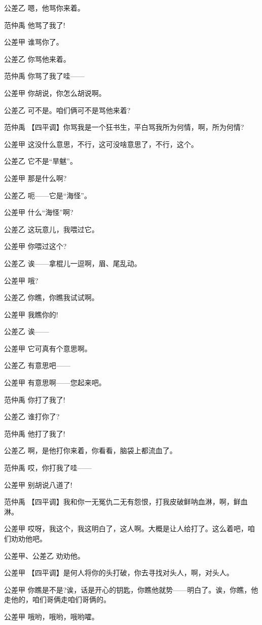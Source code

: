 公差乙 嗯，他骂你来着。

范仲禹 他骂了我了!

公差甲 谁骂你了。

公差乙 你骂他来着。

范仲禹 你骂了我了哇------

公差甲 你胡说，你怎么胡说啊。

公差乙 可不是。咱们俩可不是骂他来着?

范仲禹 【四平调】你骂我是一个狂书生，平白骂我所为何情，啊，所为何情?

公差甲 这没什么意思，不行，这可没啥意思了，不行，这个。

公差乙 它不是``旱魃''。

公差甲 那是什么啊?

公差乙 呃------它是``海怪''。

公差甲 什么``海怪''啊?

公差乙 这玩意儿，我喂过它。

公差甲 你喂过这个?

公差乙 诶------拿棍儿一逗啊，眉、尾乱动。

公差甲 哦?

公差乙 你瞧，你瞧我试试啊。

公差甲 我瞧你的!

公差乙 诶------

公差甲 它可真有个意思啊。

公差乙 有意思吧------

公差甲 有意思啊------您起来吧。

范仲禹 你打了我了!

公差乙 谁打你了?

范仲禹 他打了我了!

公差乙 啊，是他打你来着，你看看，脑袋上都流血了。

范仲禹 哎，你打我了哇------

公差甲 别胡说八道了!

范仲禹
【四平调】我和你一无冤仇二无有怨恨，打我皮破鲜呐血淋，啊，鲜血淋。

公差甲
哎呀，我这个，我这明白了，这人啊。大概是让人给打了。这么着吧，咱们劝劝他吧。

公差甲、公差乙 劝劝他。

公差甲 【四平调】是何人将你的头打破，你去寻找对头人，啊，对头人。

公差甲
你瞧是不是?诶，话是开心的钥匙，你瞧他就势------明白了。诶，你瞧，他走他的，咱们哥俩走咱们哥俩的。

公差甲 哦哟，哦哟，哦哟嚯。

